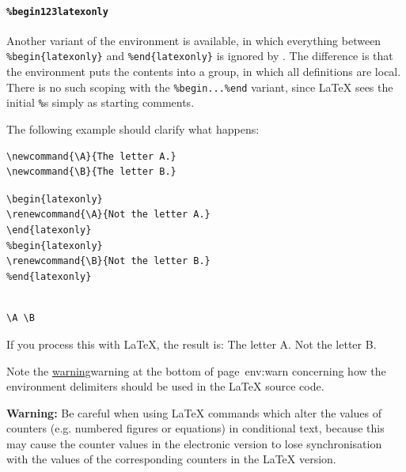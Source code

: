 %
%
%
\paragraph*{\texttt{\%begin\char123latexonly}\label{unlatexonly}}
Another variant of the  environment is available, 
in which everything between 
\verb|%|\verb|begin{latexonly}| and \verb|%|\verb|end{latexonly}| 
is ignored by \latextohtml.  
The difference is that the  environment 
puts the contents into a group, in which all definitions are local.
There is no such scoping with the \verb|%begin...%end| variant,
since \LaTeX{} sees the initial \texttt{\%}s simply as starting comments.%

\medskip
{}\html{\\}\noindent
The following example should clarify what happens:
\begin{small}
\begin{verbatim}
\newcommand{\A}{The letter A.}
\newcommand{\B}{The letter B.}
\end{verbatim}
\indent\indent\indent\verb|\|\verb|begin{latexonly}|\\
\indent\indent\verb|\renewcommand{\A}{Not the letter A.}|\\
\indent\indent\verb|\|\verb|end{latexonly}|\\
\indent\indent\verb|%|\verb|begin{latexonly}|\\
\indent\indent\verb|\renewcommand{\B}{Not the letter B.}|\\
\indent\indent\verb|%|\verb|end{latexonly}|
\begin{verbatim}

\A \B

\end{verbatim}
\end{small}
If you process this with \LaTeX, the result is: 
\quad\quad The letter A. Not the letter B.

\smallskip\noindent
Note the \hyperref[page]{warning}{warning at the bottom of page~}{}{env:warn}
concerning how the environment delimiters should be used in the
\LaTeX{} source code.

\medskip{}\html{\\}\noindent
\textbf{Warning: }%
Be careful when using \LaTeX{}  commands which alter the values of counters 
(e.g. numbered figures or equations) in conditional text, because this may 
cause the counter values in the electronic version to lose synchronisation 
with the values of the corresponding counters in the \LaTeX{} version.


